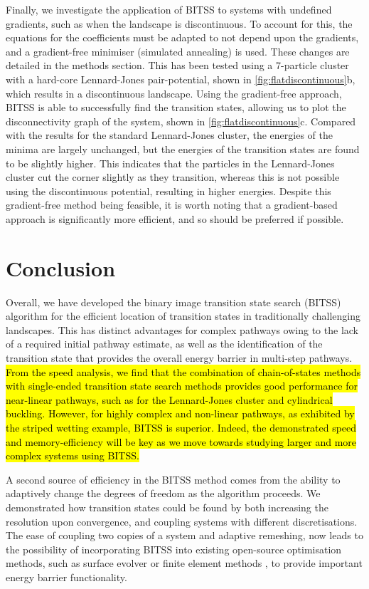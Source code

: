 \documentclass[aip,jcp,reprint,twocolumn]{revtex4-1}
\begin{document}
Finally, we investigate the application of BITSS to systems with undefined gradients, such as when the landscape is discontinuous.
To account for this, the equations for the coefficients must be adapted to not depend upon the gradients, and a gradient-free minimiser (simulated annealing) is used.
These changes are detailed in the methods section.
This has been tested using a 7-particle cluster with a hard-core Lennard-Jones pair-potential, shown in \cref{fig:flatdiscontinuous}b, which results in a discontinuous landscape.
Using the gradient-free approach, BITSS is able to successfully find the transition states, allowing us to plot the disconnectivity graph of the system, shown in \cref{fig:flatdiscontinuous}c.
Compared with the results for the standard Lennard-Jones cluster, the energies of the minima are largely unchanged, but the energies of the transition states are found to be slightly higher.
This indicates that the particles in the Lennard-Jones cluster cut the corner slightly as they transition, whereas this is not possible using the discontinuous potential, resulting in higher energies.
Despite this gradient-free method being feasible, it is worth noting that a gradient-based approach is significantly more efficient, and so should be preferred if possible.


\section{Conclusion}
Overall, we have developed the binary image transition state search (BITSS) algorithm for the efficient location of transition states in traditionally challenging landscapes.
This has distinct advantages for complex pathways owing to the lack of a required initial pathway estimate, as well as the identification of the transition state that provides the overall energy barrier in multi-step pathways.
\hl{From the speed analysis, we find that the combination of chain-of-states methods with single-ended transition state search methods provides good performance for near-linear pathways, such as for the Lennard-Jones cluster and cylindrical buckling.
However, for highly complex and non-linear pathways, as exhibited by the striped wetting example, BITSS is superior.
Indeed, the demonstrated speed and memory-efficiency will be key as we move towards studying larger and more complex systems using BITSS.}

A second source of efficiency in the BITSS method comes from the ability to adaptively change the degrees of freedom as the algorithm proceeds.
We demonstrated how transition states could be found by both increasing the resolution upon convergence, and coupling systems with different discretisations.
The ease of coupling two copies of a system and adaptive remeshing, now leads to the possibility of incorporating BITSS into existing open-source optimisation methods, such as surface evolver \cite{Brakke1992} or finite element methods \cite{Kolev2021}, to provide important energy barrier functionality.
\end{document}
